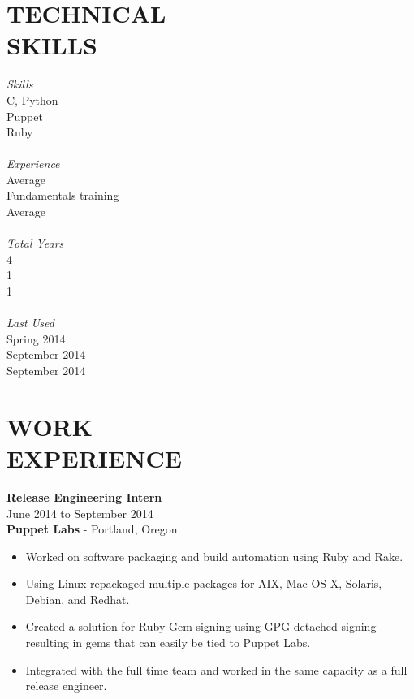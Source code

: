 \documentclass[mm]{res}
\begin{document}
\begin{resume}
\section{TECHNICAL \\ SKILLS} 
\begin{multicols}{4}
	{\sl Skills} \\
	C, Python \\ 
	Puppet \\ 
  Ruby \\ \\
	{\sl Experience} \\
	Average \\ 
	Fundamentals training \\ 
  Average \\ \\
	{\sl Total Years} \\
	4 \\ 
	1 \\ 
  1 \\ \\ 
	{\sl Last Used} \\
	Spring 2014 \\
	September 2014 \\
  September 2014 \\
\end{multicols}
 
\section{WORK \\ EXPERIENCE}  
	\textbf{Release Engineering Intern} \\
	June 2014 to September 2014 \\
	\textbf{Puppet Labs} - Portland, Oregon \\
\begin{itemize} \parskip0pt  \itemsep-8pt
	\item Worked on software packaging and build automation using Ruby and Rake. \\
	\item Using Linux repackaged multiple packages for AIX, Mac OS X, Solaris, Debian, and Redhat. \\
	\item Created a solution for Ruby Gem signing using GPG detached signing resulting in gems that can easily be tied to Puppet Labs. \\
	\item Integrated with the full time team and worked in the same capacity as a full release engineer. \\
\end{itemize}

\end{resume}
\end{document}
